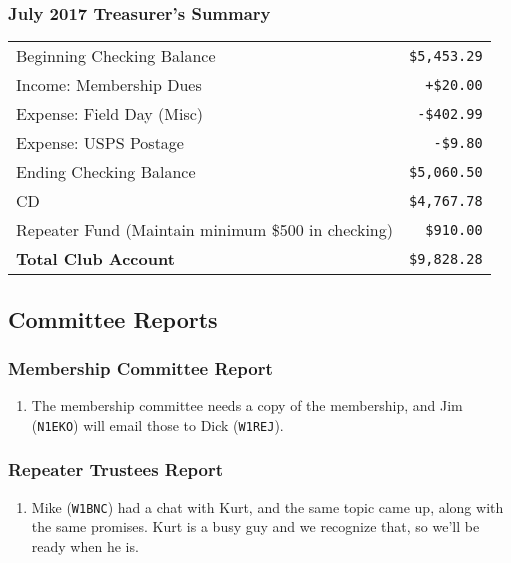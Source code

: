 \documentclass[10pt,letterpaper]{article}
\begin{document}
\subsubsection{July 2017 Treasurer's Summary}
\noindent
\begin{tabular}{|l|r|}
  \hline
  Beginning Checking Balance & \texttt{\$5,453.29} \\
  Income: Membership Dues & \texttt{+\$20.00} \\
  Expense: Field Day (Misc) & \texttt{-\$402.99} \\
  Expense: USPS Postage & \texttt{-\$9.80} \\
  Ending Checking Balance & \texttt{\$5,060.50} \\
  \hline
  \hline
  CD & \texttt{\$4,767.78} \\
  \hline
  \hline
  Repeater Fund (Maintain minimum \$500 in checking) & \texttt{\$910.00} \\
  \hline
  \hline
  \textbf{Total Club Account} & \texttt{\$9,828.28} \\
  \hline
\end{tabular}

\subsection{Committee Reports}

\subsubsection{Membership Committee Report}
\begin{enumerate}
  \item The membership committee needs a copy of the membership, and Jim (\texttt{N1EKO}) will email those to Dick (\texttt{W1REJ}).
\end{enumerate}

\subsubsection{Repeater Trustees Report}
\begin{enumerate}
  \item Mike (\texttt{W1BNC}) had a chat with Kurt, and the same topic came up, along with the same promises. Kurt is a busy guy and we recognize that, so we'll be ready when he is.
\end{enumerate}
\end{document}
